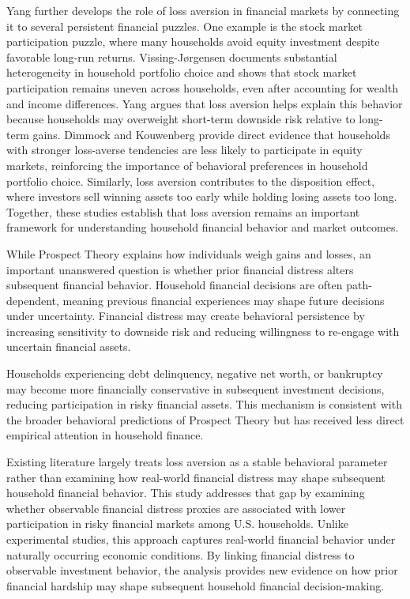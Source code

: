 \documentclass[12pt]{article}
\begin{document}
Yang \citep{yang2019loss} further develops the role of loss aversion in financial markets by connecting it to several persistent financial puzzles. One example is the stock market participation puzzle, where many households avoid equity investment despite favorable long-run returns. Vissing-J{\o}rgensen \cite{vissing2002towards} documents substantial heterogeneity in household portfolio choice and shows that stock market participation remains uneven across households, even after accounting for wealth and income differences. Yang \citep{yang2019loss} argues that loss aversion helps explain this behavior because households may overweight short-term downside risk relative to long-term gains. Dimmock and Kouwenberg \cite{dimmock2010loss} provide direct evidence that households with stronger loss-averse tendencies are less likely to participate in equity markets, reinforcing the importance of behavioral preferences in household portfolio choice. Similarly, loss aversion contributes to the disposition effect, where investors sell winning assets too early while holding losing assets too long. Together, these studies establish that loss aversion remains
an important framework for understanding household financial behavior and market outcomes.

While Prospect Theory explains how individuals weigh gains and losses, an important
unanswered question is whether prior financial distress alters subsequent financial behavior.
Household financial decisions are often path-dependent, meaning previous financial experiences
may shape future decisions under uncertainty. Financial distress may create behavioral
persistence by increasing sensitivity to downside risk and reducing willingness to re-engage
with uncertain financial assets.

Households experiencing debt delinquency, negative net worth, or bankruptcy may become
more financially conservative in subsequent investment decisions, reducing participation in
risky financial assets. This mechanism is consistent with the broader behavioral predictions
of Prospect Theory but has received less direct empirical attention in household finance.

Existing literature largely treats loss aversion as a stable behavioral parameter rather than
examining how real-world financial distress may shape subsequent household financial behavior.
This study addresses that gap by examining whether observable financial distress proxies are
associated with lower participation in risky financial markets among U.S. households. Unlike
experimental studies, this approach captures real-world financial behavior under naturally
occurring economic conditions. By linking financial distress to observable investment behavior,
the analysis provides new evidence on how prior financial hardship may shape subsequent
household financial decision-making.
\end{document}
